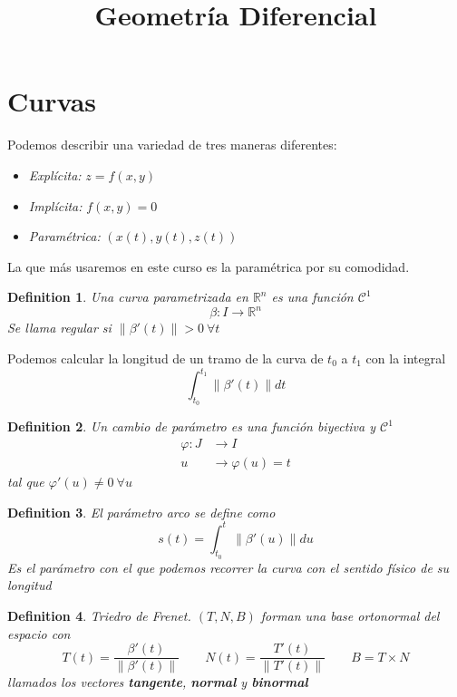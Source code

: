 \documentclass[leqno]{article}
\title{Geometría Diferencial}
\newtheorem*{definition}{Definition}
\begin{document}
\maketitle
\tableofcontents
\newpage

\section{Curvas}
Podemos describir una variedad de tres maneras diferentes:
\begin{itemize}
  \item \textit{Explícita:} $z = f(x, y)$
  \item \textit{Implícita:} $f(x, y)=0$
  \item \textit{Paramétrica:} $(x(t), y(t), z(t))$
\end{itemize}
La que más usaremos en este curso es la paramétrica por su comodidad.

\begin{definition}
Una curva parametrizada en $\mathbb{R}^n$ es una función $\mathcal{C}^1$ 
\[
\beta : I \to \mathbb{R}^n
\] 
Se llama regular si $\|\beta'(t)\|>0 \ \forall t$
\end{definition}

Podemos calcular la longitud de un tramo de la curva de $t_0$ a $t_1$ con la integral
\[
\int_{t_0}^{t_1}\|\beta'(t)\|dt
\] 

\begin{definition}
Un cambio de parámetro es una función biyectiva y $\mathcal{C}^1$
\begin{align*}
  \varphi : J & \to I \\
  u & \to \varphi (u) = t
\end{align*}
tal que $\varphi '(u)\neq 0 \ \forall u$

\end{definition}

\begin{definition}
El parámetro arco se define como
\[
s(t) = \int_{t_0}^{t}\|\beta '(u)\|du
\]
Es el parámetro con el que podemos recorrer la curva con el sentido físico de su longitud
\end{definition}

\begin{definition}
Triedro de Frenet. $(T, N, B)$ forman una base ortonormal del espacio con
 \[
   T(t) = \frac{\beta'(t)}{\|\beta'(t)\|} \qquad N(t) =
\frac{T'(t)}{\|T'(t)\|} \qquad
B = T\times N
\] 
llamados los vectores \textbf{tangente}, \textbf{normal} y \textbf{binormal}
\end{definition}
\end{document}
